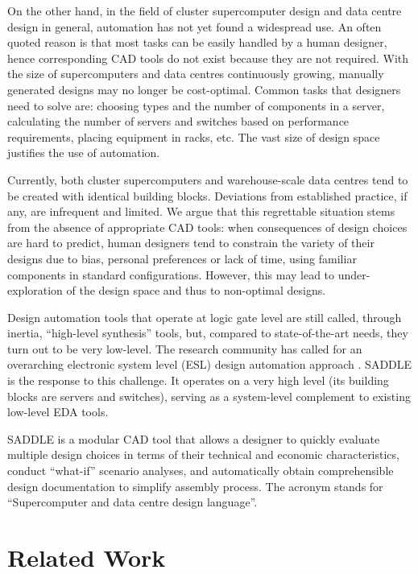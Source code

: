 \documentclass[runningheads,a4paper]{llncs}
\begin{document}
On the other hand, in the field of cluster supercomputer design and data centre design in general, automation has not yet found a widespread use. An often quoted reason is that most tasks can be easily handled by a human designer, hence corresponding CAD tools do not exist because they are not required. With the size of supercomputers and data centres continuously growing, manually generated designs may no longer be cost-optimal. Common tasks that designers need to solve are: choosing types and the number of components in a server, calculating the number of servers and switches based on performance requirements, placing equipment in racks, etc. The vast size of design space justifies the use of automation.

Currently, both cluster supercomputers and warehouse-scale data centres tend to be created with identical building blocks. Deviations from established practice, if any, are infrequent and limited. We argue that this regrettable situation stems from the absence of appropriate CAD tools: when consequences of design choices are hard to predict, human designers tend to constrain the variety of their designs due to bias, personal preferences or lack of time, using familiar components in standard configurations. However, this may lead to under-exploration of the design space and thus to non-optimal designs.

Design automation tools that operate at logic gate level are still called, through inertia, ``high-level synthesis'' tools, but, compared to state-of-the-art needs, they turn out to be very low-level. The research community has called for an overarching electronic system level (ESL) design automation approach \cite{duranton2010hipeac}. SADDLE is the response to this challenge. It operates on a very high level (its building blocks are servers and switches), serving as a system-level complement to existing low-level EDA tools.

SADDLE is a modular CAD tool that allows a designer to quickly evaluate multiple design choices in terms of their technical and economic characteristics, conduct ``what-if'' scenario analyses, and automatically obtain comprehensible design documentation to simplify assembly process. The acronym stands for ``Supercomputer and data centre design language''.

\section{Related Work}
\end{document}

